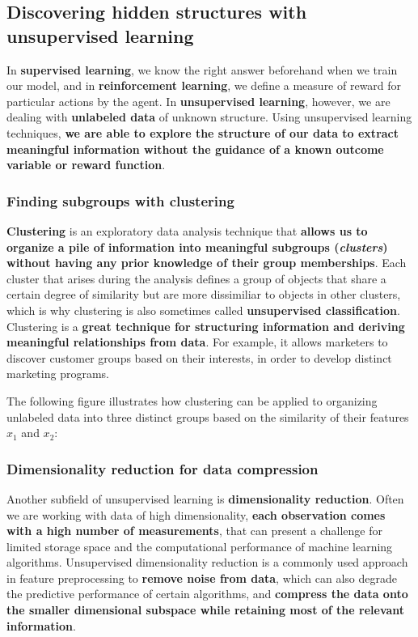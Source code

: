 \documentclass[11pt]{article}
\begin{document}
    \subsection{Discovering hidden structures with unsupervised
learning}\label{discovering-hidden-structures-with-unsupervised-learning}

    In \textbf{supervised learning}, we know the right answer beforehand
when we train our model, and in \textbf{reinforcement learning}, we
define a measure of reward for particular actions by the agent. In
\textbf{unsupervised learning}, however, we are dealing with
\textbf{unlabeled data} of unknown structure. Using unsupervised
learning techniques, \textbf{we are able to explore the structure of our
data to extract meaningful information without the guidance of a known
outcome variable or reward function}.

    \subsubsection{Finding subgroups with
clustering}\label{finding-subgroups-with-clustering}

    \textbf{Clustering} is an exploratory data analysis technique that
\textbf{allows us to organize a pile of information into meaningful
subgroups (\emph{clusters}) without having any prior knowledge of their
group memberships}. Each cluster that arises during the analysis defines
a group of objects that share a certain degree of similarity but are
more dissimiliar to objects in other clusters, which is why clustering
is also sometimes called \textbf{unsupervised classification}.
Clustering is a \textbf{great technique for structuring information and
deriving meaningful relationships from data}. For example, it allows
marketers to discover customer groups based on their interests, in order
to develop distinct marketing programs.

    The following figure illustrates how clustering can be applied to
organizing unlabeled data into three distinct groups based on the
similarity of their features \(x_1\) and \(x_2\):

    

    \subsubsection{Dimensionality reduction for data
compression}\label{dimensionality-reduction-for-data-compression}

    Another subfield of unsupervised learning is \textbf{dimensionality
reduction}. Often we are working with data of high dimensionality,
\textbf{each observation comes with a high number of measurements}, that
can present a challenge for limited storage space and the computational
performance of machine learning algorithms. Unsupervised dimensionality
reduction is a commonly used approach in feature preprocessing to
\textbf{remove noise from data}, which can also degrade the predictive
performance of certain algorithms, and \textbf{compress the data onto
the smaller dimensional subspace while retaining most of the relevant
information}.
\end{document}
